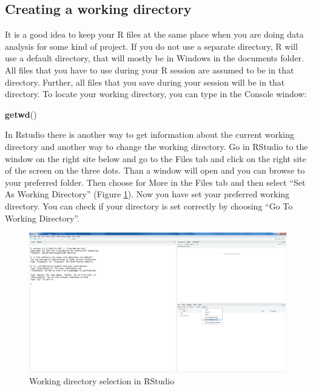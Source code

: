 \documentclass[]{book}
\newenvironment{Shaded}{\begin{snugshade}}{\end{snugshade}}
\newcommand{\KeywordTok}[1]{\textcolor[rgb]{0.13,0.29,0.53}{\textbf{#1}}}
\newcommand{\NormalTok}[1]{#1}
\theoremstyle{definition}
\theoremstyle{definition}
\theoremstyle{definition}
\theoremstyle{remark}
\begin{document}
\subsection{Creating a working
directory}\label{creating-a-working-directory}

It is a good idea to keep your R files at the same place when you are
doing data analysis for some kind of project. If you do not use a
separate directory, R will use a default directory, that will mostly be
in Windows in the documents folder. All files that you have to use
during your R session are assumed to be in that directory. Further, all
files that you save during your session will be in that directory. To
locate your working directory, you can type in the Console window:

\begin{Shaded}
\begin{Highlighting}[]
\KeywordTok{getwd}\NormalTok{()}
\end{Highlighting}
\end{Shaded}

In Rstudio there is another way to get information about the current
working directory and another way to change the working directory. Go in
RStudio to the window on the right site below and go to the Files tab
and click on the right site of the screen on the three dots. Than a
window will open and you can browse to your preferred folder. Then
choose for More in the Files tab and then select ``Set As Working
Directory'' (Figure \ref{fig:fig12}). Now you have set your preferred
working directory. You can check if your directory is set correctly by
choosing ``Go To Working Directory''.

\begin{figure}

{\centering \includegraphics[width=0.9\linewidth]{images/fig1.12} 

}

\caption{Working directory selection in RStudio}\label{fig:fig12}
\end{figure}
\end{document}

